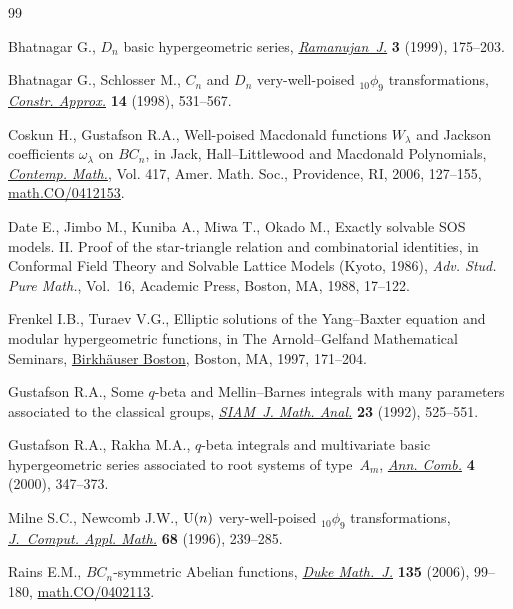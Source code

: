 \documentclass[pdftex]{sigma}
\numberwithin{equation}{section}
\begin{document}
\begin{thebibliography}{99}
\footnotesize\itemsep=0pt

Bhatnagar G., {$D_n$} basic hypergeometric series, \href{https://doi.org/10.1023/A:1006997424561}{\textit{Ramanujan~J.}}
 \textbf{3} (1999), 175--203.

Bhatnagar G., Schlosser M., {$C_n$} and {$D_n$} very-well-poised
 {${}_{10}\phi_9$} transformations, \href{https://doi.org/10.1007/s003659900089}{\textit{Constr. Approx.}} \textbf{14}
 (1998), 531--567.

Coskun H., Gustafson R.A., Well-poised {M}acdonald functions {$W_\lambda$} and
 {J}ackson coef\/f\/icients {$\omega_\lambda$} on {$BC_n$}, in Jack,
 {H}all--{L}ittlewood and {M}acdonald Polynomials, \href{https://doi.org/10.1090/conm/417/07919}{\textit{Contemp. Math.}},
 Vol. 417, Amer. Math. Soc., Providence, RI, 2006, 127--155,
 \href{http://arxiv.org/abs/math.CO/0412153}{math.CO/0412153}.

Date E., Jimbo M., Kuniba A., Miwa T., Okado M., Exactly solvable {SOS} models.
 {II}. {P}roof of the star-triangle relation and combinatorial identities, in
 Conformal Field Theory and Solvable Lattice Models ({K}yo\-to, 1986),
 \textit{Adv. Stud. Pure Math.}, Vol.~16, Academic Press, Boston, MA, 1988,
 17--122.

Frenkel I.B., Turaev V.G., Elliptic solutions of the {Y}ang--{B}axter equation
 and modular hypergeometric functions, in The {A}rnold--{G}elfand Mathematical
 Seminars, \href{https://doi.org/10.1007/978-1-4612-4122-5_9}{Birkh\"auser Boston}, Boston, MA, 1997, 171--204.

Gustafson R.A., Some {$q$}-beta and {M}ellin--{B}arnes integrals with many
 parameters associated to the classical groups, \href{https://doi.org/10.1137/0523026}{\textit{SIAM~J. Math. Anal.}}
 \textbf{23} (1992), 525--551.

Gustafson R.A., Rakha M.A., {$q$}-beta integrals and multivariate basic
 hypergeometric series associated to root systems of type~{$A_m$},
 \href{https://doi.org/10.1007/PL00001285}{\textit{Ann. Comb.}} \textbf{4} (2000), 347--373.

Milne S.C., Newcomb J.W., {${\rm U}(n)$} very-well-poised {$_{10}\phi_9$}
 transformations, \href{https://doi.org/10.1016/0377-0427(95)00248-0}{\textit{J.~Comput. Appl. Math.}} \textbf{68} (1996),
 239--285.

Rains E.M., {$BC_n$}-symmetric {A}belian functions, \href{https://doi.org/10.1215/S0012-7094-06-13513-5}{\textit{Duke Math.~J.}}
 \textbf{135} (2006), 99--180, \href{http://arxiv.org/abs/math.CO/0402113}{math.CO/0402113}.


\end{thebibliography}
\end{document}
